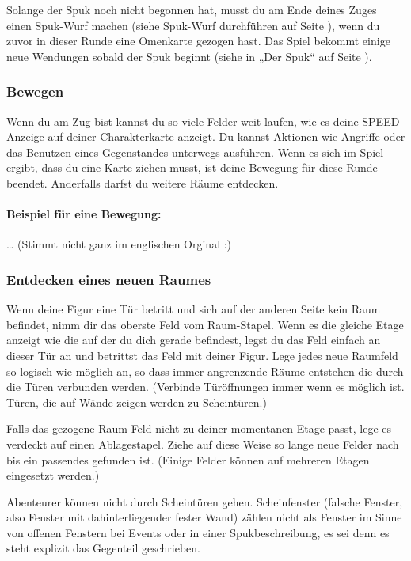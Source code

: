 Solange der Spuk noch nicht begonnen hat, musst du am Ende deines Zuges einen Spuk-Wurf machen (siehe Spuk-Wurf durchführen auf Seite \pageref{kap:rule:makehauntroll}), wenn du zuvor in dieser Runde eine Omenkarte gezogen hast. Das Spiel bekommt einige neue Wendungen sobald der Spuk beginnt (siehe in
„Der Spuk“ auf Seite \pageref{kap:rule:haunt}).


\subsubsection{Bewegen}

Wenn du am Zug bist kannst du so viele Felder weit laufen, wie es deine SPEED-Anzeige auf deiner Charakterkarte anzeigt. Du kannst Aktionen wie Angriffe oder das Benutzen eines Gegenstandes unterwegs ausführen. Wenn es sich im Spiel ergibt, dass du eine Karte ziehen musst, ist deine Bewegung für diese Runde beendet. Anderfalls darfst du weitere Räume entdecken.

\paragraph{Beispiel für eine Bewegung:} … (Stimmt nicht ganz im englischen Orginal :)

\subsubsection{Entdecken eines neuen Raumes}
\label{kap:rule:discoverroom}

Wenn deine Figur eine Tür betritt und sich auf der anderen Seite kein Raum befindet, nimm dir das oberste Feld vom Raum-Stapel. Wenn es die gleiche Etage anzeigt wie die auf der du dich gerade befindest, legst du das Feld einfach an dieser Tür an und betrittst das Feld mit deiner Figur. Lege jedes neue Raumfeld so logisch wie möglich an, so dass immer angrenzende Räume entstehen die durch die Türen verbunden werden. (Verbinde Türöffnungen immer wenn es möglich ist. Türen, die auf Wände zeigen werden zu Scheintüren.)

Falls das gezogene Raum-Feld nicht zu deiner momentanen Etage passt, lege es verdeckt auf einen Ablagestapel. Ziehe auf diese Weise so lange neue Felder nach bis ein passendes gefunden ist. (Einige Felder können auf mehreren Etagen eingesetzt werden.)

Abenteurer können nicht durch Scheintüren gehen. Scheinfenster (falsche Fenster, also Fenster mit dahinterliegender fester Wand) zählen nicht als Fenster im Sinne von offenen Fenstern bei Events oder in einer Spukbeschreibung, es sei denn es steht explizit das Gegenteil geschrieben.

